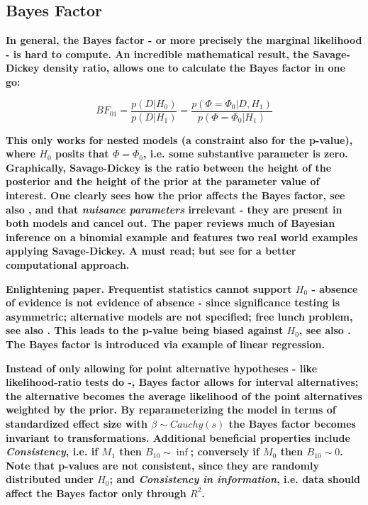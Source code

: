 \documentclass[12pt]{scrartcl}
\begin{document}
\subsection{Bayes Factor}
\begin{description}
  \item {}
  
  \item {}
  
  \item {}
  
  \textbf{In general, the Bayes factor - or more precisely the marginal likelihood - is hard to compute. An incredible mathematical result, the Savage-Dickey density ratio, allows one to calculate the Bayes factor in one go:}
  
  \begin{equation*}
    BF_{01} = \frac{p(D|H_0)}{p(D|H_1)} = \frac{p(\Phi = \Phi_0|D, H_1)}{p(\Phi = \Phi_0|H_1)}
  \end{equation*}
  
  \textbf{This only works for nested models (a constraint also for the p-value), where $H_0$ posits that $\Phi = \Phi_0$, i.e. some substantive parameter is zero. Graphically, Savage-Dickey is the ratio between the height of the posterior and the height of the prior at the parameter value of interest. One clearly sees how the prior affects the Bayes factor, see also \cite{liu2008bayes}, and that \emph{nuisance parameters} irrelevant - they are present in both models and cancel out. The paper reviews much of Bayesian inference on a binomial example and features two real world examples applying Savage-Dickey. A must read; but see \cite{morey2011using} for a better computational approach.}
  
  \item {}
  
  \textbf{Enlightening paper. Frequentist statistics cannot support $H_0$ - absence of evidence is not evidence of absence - since significance testing is asymmetric; alternative models are not specified; free lunch problem, see also \cite{rouder2014p}. This leads to the p-value being biased against $H_0$, see also \cite{wagenmakers2007practical, rouder2009bayesian}. The Bayes factor is introduced via example of linear regression.}
  
  \textbf{Instead of only allowing for point alternative hypotheses - like likelihood-ratio tests do -, Bayes factor allows for interval alternatives; the alternative becomes the average likelihood of the point alternatives weighted by the prior. By reparameterizing the model in terms of standardized effect size with $\beta \sim Cauchy(s)$ the Bayes factor becomes invariant to transformations. Additional beneficial properties include \emph{Consistency}, i.e. if $M_1$ then $B_{10} \sim \inf$; conversely if $M_0$ then $B_{10} \sim 0$. Note that p-values are not consistent, since they are randomly distributed under $H_0$; and \emph{Consistency in information}, i.e. data should affect the Bayes factor only through $R^2$.}
  

\end{description}
\end{document}
